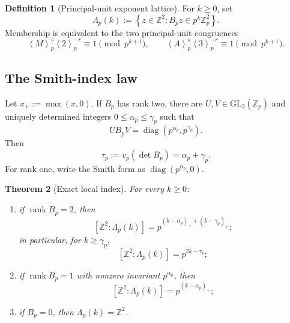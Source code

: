 \documentclass[11pt,oneside]{article}
\newtheorem{theorem}{Theorem}[section]
\theoremstyle{definition}
\newtheorem{definition}[theorem]{Definition}
\newcommand{\Z}{\mathbb{Z}}
\newcommand{\rank}{\operatorname{rank}}
\newcommand{\diag}{\operatorname{diag}}
\newcommand{\ang}[1]{\left\langle #1\right\rangle}
\newcommand{\set}[1]{\left\{#1\right\}}
\begin{document}
\begin{definition}[Principal-unit exponent lattice]
For $k\ge0$, set
\begin{equation}\label{eq:Lambda-p-k}
  \Lambda_p(k)
  :=\set{z\in\Z^2:B_pz\in p^k\Z_p^2}.
\end{equation}
Membership is equivalent to the two principal-unit congruences
\begin{equation}\label{eq:principal-congruences}
  \ang{M}_p^s\ang{2}_p^{-r}\equiv1\pmod{p^{k+1}},
  \qquad
  \ang{A}_p^s\ang{3}_p^{-r}\equiv1\pmod{p^{k+1}}.
\end{equation}
\end{definition}

\subsection{The Smith-index law}

Let $x_+:=\max(x,0)$.  If $B_p$ has rank two, there are
$U,V\in\mathrm{GL}_2(\Z_p)$ and uniquely determined integers
$0\le\alpha_p\le\gamma_p$ such that
\begin{equation}\label{eq:SNF}
  U B_p V=\diag(p^{\alpha_p},p^{\gamma_p}).
\end{equation}
Then
\begin{equation}\label{eq:tau-def}
  \tau_p:=v_p(\det B_p)=\alpha_p+\gamma_p.
\end{equation}
For rank one, write the Smith form as $\diag(p^{\alpha_p},0)$.

\begin{theorem}[Exact local index]\label{thm:smith-index}
For every $k\ge0$:
\begin{enumerate}
  \item if $\rank B_p=2$, then
  \begin{equation}\label{eq:rank2-index}
    [\Z^2:\Lambda_p(k)]
    =p^{(k-\alpha_p)_+ +(k-\gamma_p)_+};
  \end{equation}
  in particular, for $k\ge\gamma_p$,
  \begin{equation}\label{eq:stable-rank2-index}
    [\Z^2:\Lambda_p(k)]=p^{2k-\tau_p};
  \end{equation}
  \item if $\rank B_p=1$ with nonzero invariant $p^{\alpha_p}$, then
  \begin{equation}\label{eq:rank1-index}
    [\Z^2:\Lambda_p(k)]=p^{(k-\alpha_p)_+};
  \end{equation}
  \item if $B_p=0$, then $\Lambda_p(k)=\Z^2$.
\end{enumerate}
\end{theorem}
\end{document}
